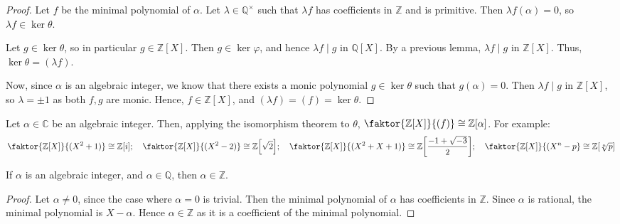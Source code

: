 \begin{proof}
	Let \( f \) be the minimal polynomial of \( \alpha \).
	Let \( \lambda \in \mathbb Q^\times \) such that \( \lambda f \) has coefficients in \( \mathbb Z \) and is primitive.
	Then \( \lambda f(\alpha) = 0 \), so \( \lambda f \in \ker \theta \).

	Let \( g \in \ker \theta \), so in particular \( g \in \mathbb Z[X] \).
	Then \( g \in \ker \varphi \), and hence \( \lambda f \mid g \) in \( \mathbb Q[X] \).
	By a previous lemma, \( \lambda f \mid g \) in \( \mathbb Z[X] \).
	Thus, \( \ker \theta = (\lambda f) \).

	Now, since \( \alpha \) is an algebraic integer, we know that there exists a monic polynomial \( g \in \ker \theta \) such that \( g(\alpha) = 0 \).
	Then \( \lambda f \mid g \) in \( \mathbb Z[X] \), so \( \lambda = \pm 1 \) as both \( f, g \) are monic.
	Hence, \( f \in \mathbb Z[X] \), and \( (\lambda f) = (f) = \ker \theta \).
\end{proof}
Let \( \alpha \in \mathbb C \) be an algebraic integer.
Then, applying the isomorphism theorem to \( \theta \), \( \faktor{\mathbb Z[X]}{(f)} \cong \mathbb Z[\alpha] \).
For example:
\[ \faktor{\mathbb Z[X]}{(X^2 + 1)} \cong \mathbb Z[i];\quad \faktor{\mathbb Z[X]}{(X^2 - 2)} \cong \mathbb Z\qty[\sqrt{2}];\quad \faktor{\mathbb Z[X]}{(X^2 + X + 1)} \cong \mathbb Z\qty[\frac{-1+\sqrt{-3}}{2}];\quad \faktor{\mathbb Z[X]}{(X^n - p} \cong \mathbb Z\qty[\sqrt[n]{p}] \]
\begin{corollary}
	If \( \alpha \) is an algebraic integer, and \( \alpha \in \mathbb Q \), then \( \alpha \in \mathbb Z \).
\end{corollary}
\begin{proof}
	Let \( \alpha \neq 0 \), since the case where \( \alpha = 0 \) is trivial.
	Then the minimal polynomial of \( \alpha \) has coefficients in \( \mathbb Z \).
	Since \( \alpha \) is rational, the minimal polynomial is \( X - \alpha \).
	Hence \( \alpha \in \mathbb Z \) as it is a coefficient of the minimal polynomial.
\end{proof}
